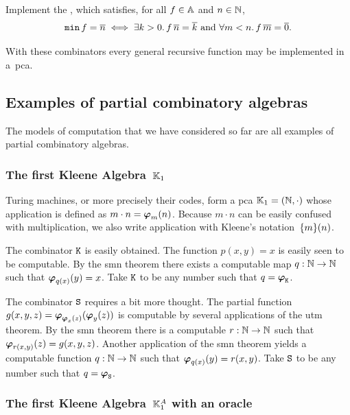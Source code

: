 \begin{exercise}
  Implement the , which satisfies, for all $f \in \AA$ and $n \in \NN$,
  \begin{equation*}
    \combMin \, f = \numeral{n}
    \iff
    \text{$\some{k > 0} f \, \overline{n} = \overline{k}$
          and
          $\all{m < n} f \, \overline{m} = \overline{0}$.}
  \end{equation*}
\end{exercise}

With these combinators every general recursive function may be implemented in a~pca.


\subsection{Examples of partial combinatory algebras}
\label{sec:pca-examples}

The models of computation that we have considered so far are all
examples of partial combinatory algebras.

\subsubsection[\texorpdfstring%
{The first Kleene Algebra $\klone$}%
{The first Kleene Algebra K1}%
]{The first Kleene Algebra~$\klone$}
\label{sec:first-kleene-pca}%

Turing machines, or more precisely their codes, form a pca $\klone = (\NN, {\cdot})$ whose
application is defined as $m \cdot n = \pr{m}{n}$. Because $m \cdot n$ can be easily
confused with multiplication, we also write application with Kleene's notation~$\set{m}(n)$.

The combinator $\combK$ is easily obtained. The function $p(x,y) = x$
is easily seen to be computable. By the smn theorem there exists a
computable map $q : \NN \to \NN$ such that $\pr{q(x)}{y} = x$. Take
$\combK$ to be any number such that $q = \xpr_\combK$.

The combinator $\combS$ requires a bit more thought. The partial
function $g(x,y,z) = \pr{\pr{x}{z}}{\pr{y}{z}}$ is computable
by several applications of the utm theorem. By the smn
theorem there is a computable $r : \NN \to \NN$ such that
$\pr{r(x,y)}{z} = g(x,y,z)$. Another application of the smn theorem
yields a computable function $q : \NN \to \NN$ such that $\pr{q(x)}{y}
= r(x,y)$. Take $\combS$ to be any number such that $q = \xpr_\combS$.

\subsubsection[\texorpdfstring%
{The first Kleene Algebra $\klone^A$ with an oracle}%
{The first Kleene Algebra K1A with an oracle}%
]{The first Kleene Algebra~$\klone^A$ with an oracle}
\label{sec:first-kleene-pca-oracle}%

